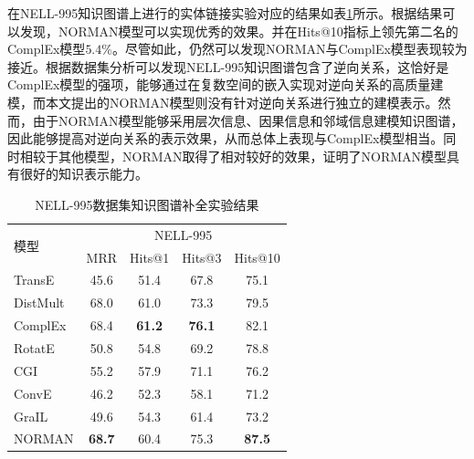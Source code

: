 \documentclass[algorithmlist, AutoFakeBold, AutoFakeSlant, figurelist, tablelist, nomlist, engineering]{seuthesix}
\begin{document}
在NELL-995知识图谱上进行的实体链接实验对应的结果如表\ref{Experiment1_NELL-995}所示。根据结果可以发现，NORMAN模型可以实现优秀的效果。并在Hits@10指标上领先第二名的ComplEx模型$5.4\%$。尽管如此，仍然可以发现NORMAN与ComplEx模型表现较为接近。根据数据集分析可以发现NELL-995知识图谱包含了逆向关系，这恰好是ComplEx模型的强项，能够通过在复数空间的嵌入实现对逆向关系的高质量建模，而本文提出的NORMAN模型则没有针对逆向关系进行独立的建模表示。然而，由于NORMAN模型能够采用层次信息、因果信息和邻域信息建模知识图谱，因此能够提高对逆向关系的表示效果，从而总体上表现与ComplEx模型相当。同时相较于其他模型，NORMAN取得了相对较好的效果，证明了NORMAN模型具有很好的知识表示能力。
\begin{table}[]
  \centering
  \begin{tabular*}{0.95\textwidth}{@{\extracolsep{\fill}}lcccc}
  \toprule[1pt]
  \multirow{2}{*}{模型} & \multicolumn{4}{c}{NELL-995} \\
    & MRR & Hits@1 & Hits@3 & Hits@10 \\ \hline
  TransE & 45.6 & 51.4 & 67.8 & 75.1 \\
  DistMult & 68.0 & 61.0 & 73.3 & 79.5 \\
  ComplEx & 68.4 & \textbf{61.2} & \textbf{76.1} & 82.1 \\
  RotatE & 50.8 & 54.8 & 69.2 & 78.8 \\
  CGI & 55.2 & 57.9 & 71.1 & 76.2 \\
  ConvE & 46.2 & 52.3 & 58.1 & 71.2 \\
  GraIL & 49.6 & 54.3 & 61.4 & 73.2 \\
  NORMAN & \textbf{68.7} & 60.4 & 75.3 & \textbf{87.5} \\
  \bottomrule[1pt]
  \end{tabular*}
  \caption{NELL-995数据集知识图谱补全实验结果}
  \label{Experiment1_NELL-995}
\end{table}
\end{document}
